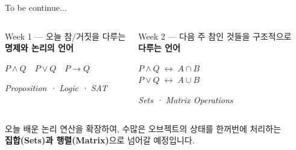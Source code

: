 \documentclass[10.5pt,compress]{beamer}
\begin{document}
\begin{frame}[t]{To be continue...}
    \vspace{0.08cm}
    \begin{columns}[T]
        \begin{block}{Week 1 — 오늘}
            \small 참/거짓을 다루는\\
            \textbf{명제와 논리의 언어}
            \vspace{0.18cm}

            \centering
            \large $P \land Q \quad P \lor Q \quad P \rightarrow Q$

            \vspace{0.18cm}
            \small\textit{Proposition · Logic · SAT}
        \end{block}

        \begin{exampleblock}{Week 2 — 다음 주}
            \small 참인 것들을 구조적으로\\
            \textbf{다루는 언어}
            \vspace{0.18cm}

            \centering
            \large $P \land Q \;\leftrightarrow\; A \cap B$\\[4pt]
            $P \lor Q \;\leftrightarrow\; A \cup B$

            \vspace{0.18cm}
            \small\textit{Sets · Matrix Operations}
        \end{exampleblock}
    \end{columns}

    \vspace{0.25cm}
    \begin{center}
        \small 오늘 배운 논리 연산을 확장하여, 수많은 오브젝트의 상태를 한꺼번에 처리하는\\
        \textbf{집합(Sets)과 행렬(Matrix)}으로 넘어갈 예정입니다.
    \end{center}
\end{frame}
\end{document}
